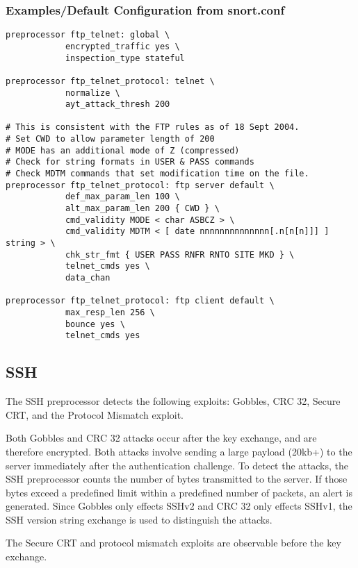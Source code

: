 \documentclass[english]{report}
\begin{document}
\subsubsection{Examples/Default Configuration from snort.conf}

\begin{verbatim}
preprocessor ftp_telnet: global \
            encrypted_traffic yes \
            inspection_type stateful

preprocessor ftp_telnet_protocol: telnet \
            normalize \
            ayt_attack_thresh 200

# This is consistent with the FTP rules as of 18 Sept 2004.
# Set CWD to allow parameter length of 200
# MODE has an additional mode of Z (compressed)
# Check for string formats in USER & PASS commands
# Check MDTM commands that set modification time on the file.
preprocessor ftp_telnet_protocol: ftp server default \
            def_max_param_len 100 \
            alt_max_param_len 200 { CWD } \
            cmd_validity MODE < char ASBCZ > \
            cmd_validity MDTM < [ date nnnnnnnnnnnnnn[.n[n[n]]] ] string > \
            chk_str_fmt { USER PASS RNFR RNTO SITE MKD } \
            telnet_cmds yes \
            data_chan

preprocessor ftp_telnet_protocol: ftp client default \
            max_resp_len 256 \
            bounce yes \
            telnet_cmds yes
\end{verbatim}

\subsection{SSH\label{sub:ssh}}

The SSH preprocessor detects the following exploits: Gobbles, CRC 32, Secure
CRT, and the Protocol Mismatch exploit.

Both Gobbles and CRC 32 attacks occur after the key exchange, and are therefore
encrypted.  Both attacks involve sending a large payload (20kb+) to the server
immediately after the authentication challenge.  To detect the attacks, the SSH
preprocessor counts the number of bytes transmitted to the server.  If those
bytes exceed a predefined limit within a predefined number of packets, an
alert is generated.  Since Gobbles only effects SSHv2 and CRC 32 only effects
SSHv1, the SSH version string exchange is used to distinguish the attacks.

The Secure CRT and protocol mismatch exploits are observable before the key
exchange.
\end{document}

